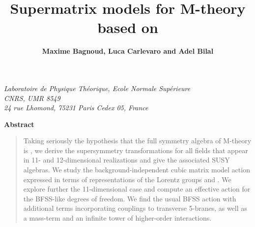 \documentclass[a4paper,11pt]{article}
\def\R{{\rm I\kern-.2em R}}
\begin{document}
\title{\huge\bf  Supermatrix models for {\cal M}-theory \\based on \myHighlight{$\mathfrak{osp}(1|32,\R)$}\coordHE{}}

\author{\bf Maxime Bagnoud\coordHE{}, Luca Carlevaro\coordHE{} and Adel Bilal\coordHE{}}
\date{}
\maketitle
\begin{center}


\coordHE{} {\it Laboratoire de Physique Th\'eorique, Ecole Normale Sup\'erieure\\
CNRS, UMR 8549 \\
24 rue Lhomond, 75231 Paris Cedex 05, France}

\end{center}

\vspace{1cm}

\begin{center}
{\bf Abstract}
\end{center}
\begin{quote}
Taking seriously the hypothesis that the full symmetry algebra of M-theory is \coordHE{},
we derive the supersymmetry transformations for all fields that appear in 11- and 
12-dimensional realizations and give the associated {\cal SUSY} algebras. 
We study the background-independent \coordHE{} cubic matrix model 
action expressed in terms of representations of the Lorentz groups \coordHE{} and \coordHE{}.
We explore further the 11-dimensional case and compute an effective action for the BFSS-like degrees of freedom. 
We find the usual BFSS action with additional terms incorporating couplings to transverse 5-branes, 
as well as a mass-term and an infinite tower of higher-order interactions.
\end{quote}
\end{document}
